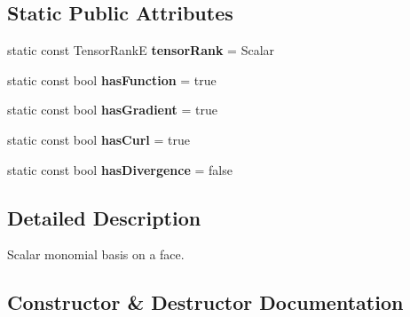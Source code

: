 \subsection*{Static Public Attributes}
\begin{DoxyCompactItemize}
\item 
\mbox{\label{classHArDCore3D_1_1MonomialScalarBasisFace_a5e2771dce6f22d686302ef1654b1d7a1}} 
static const Tensor\+RankE {\bfseries tensor\+Rank} = Scalar
\item 
\mbox{\label{classHArDCore3D_1_1MonomialScalarBasisFace_a7f8f17dffce90637f3a38831c1453db5}} 
static const bool {\bfseries has\+Function} = true
\item 
\mbox{\label{classHArDCore3D_1_1MonomialScalarBasisFace_acf6b7bb1df49b58e85f0ee9058e83761}} 
static const bool {\bfseries has\+Gradient} = true
\item 
\mbox{\label{classHArDCore3D_1_1MonomialScalarBasisFace_a99e8f7a15ecf13d854344b34c7b0f963}} 
static const bool {\bfseries has\+Curl} = true
\item 
\mbox{\label{classHArDCore3D_1_1MonomialScalarBasisFace_abded3a224b17ec37cafbebdc190889ac}} 
static const bool {\bfseries has\+Divergence} = false
\end{DoxyCompactItemize}


\subsection{Detailed Description}
Scalar monomial basis on a face. 

\subsection{Constructor \& Destructor Documentation}
\mbox{\label{classHArDCore3D_1_1MonomialScalarBasisFace_ad87f40b1e97ec1b95dcf9c56282912f3}} 
